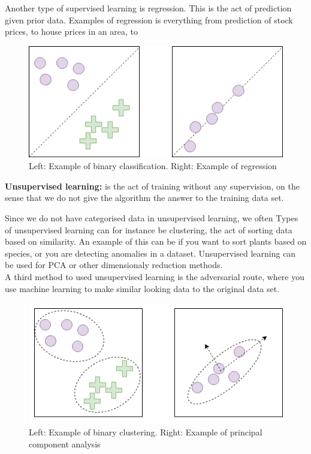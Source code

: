 	Another type of supervised learning is regression. This is the act of prediction given prior data. Examples of regression is everything from prediction of stock prices, to house prices 
	in an area, to\\ %
	\begin{figure}
	    \centering
	    \includegraphics[scale=0.5]{figures/class_vs_reg.png}
	    \caption{Left: Example of binary classification. Right: Example of regression} 
	\end{figure}
  
	\vspace{5px}
	\textbf{Unsupervised learning:} is the act of training without any supervision, on the sense that we do not give the algorithm the answer
	to the training data set. %
	 
	Since we do not have categorised data in unsupervised learning, we often %
	Types of unsupervised learning can for instance be clustering, the act of sorting data based on similarity. An example of this can be if you want to sort plants based on species, or 
	you are detecting anomalies in a dataset.
	Unsupervised learning can be used for PCA %
	or other dimensionaly reduction methods.\\
	  
	A third method to used unsupervised learning is the adversarial route, where you use machine learning to make similar looking data to the original data set. 
	    
	\begin{figure}
	    \centering
	    \includegraphics[scale=0.5]{figures/cluster_pca.png}
	    \caption{Left: Example of binary clustering. Right: Example of principal component analysis} 
	\end{figure}

